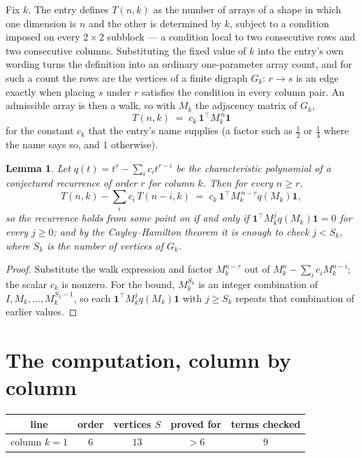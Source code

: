 \documentclass[11pt,a4paper]{article}
\theoremstyle{plain}
\newtheorem{lemma}[theorem]{Lemma}
\theoremstyle{definition}
\begin{document}
Fix $k$. The entry defines $T(n,k)$ as the number of arrays of a shape in which one dimension
is $n$ and the other is determined by $k$, subject to a condition imposed on every
$2\times2$ subblock --- a condition local to two consecutive rows and two consecutive columns.
Substituting the fixed value of $k$ into the entry's own wording turns the definition into an
ordinary one-parameter array count, and for such a count the rows are the vertices of a finite
digraph $G_k$: $r\to s$ is an edge exactly when placing $s$ under $r$ satisfies the condition
in every column pair. An admissible array is then a walk, so with $M_k$ the adjacency matrix
of $G_k$,
\[
T(n,k)\;=\;c_k\,\mathbf{1}^{\!\top}M_k^{\,n}\mathbf{1}
\]
for the constant $c_k$ that the entry's name supplies (a factor such as $\tfrac12$ or
$\tfrac14$ where the name says so, and $1$ otherwise).

\begin{lemma}\label{lem:crit}
Let $q(t)=t^{r}-\sum_i c_it^{r-i}$ be the characteristic polynomial of a conjectured
recurrence of order $r$ for column $k$. Then for every $n\ge r$,
\[
T(n,k)-\sum_i c_i\,T(n-i,k)\;=\;c_k\,\mathbf{1}^{\!\top}M_k^{\,n-r}q(M_k)\mathbf{1},
\]
so the recurrence holds from some point on if and only if
$\mathbf{1}^{\!\top}M_k^{j}q(M_k)\mathbf{1}=0$ for every $j\ge0$; and by the
Cayley--Hamilton theorem it is enough to check $j<S_k$, where $S_k$ is the number of vertices
of $G_k$.
\end{lemma}

\begin{proof}
Substitute the walk expression and factor $M_k^{n-r}$ out of $M_k^{n}-\sum_ic_iM_k^{n-i}$;
the scalar $c_k$ is nonzero. For the bound, $M_k^{S_k}$ is an integer combination of
$I,M_k,\dots,M_k^{S_k-1}$, so each $\mathbf{1}^{\!\top}M_k^{j}q(M_k)\mathbf{1}$ with
$j\ge S_k$ repeats that combination of earlier values.
\end{proof}

\section{The computation, column by column}

\begin{center}
\begin{tabular}{ccccc}
line & order & vertices $S$ & proved for & terms checked \\ \hline
column $k$$=1$ & $6$ & $13$ & $>6$ & $9$ \\
\end{tabular}
\end{center}
\end{document}
